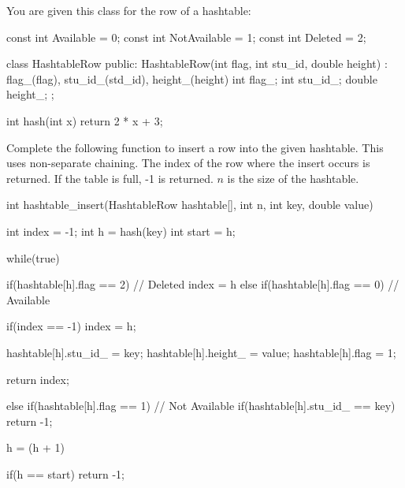 

You are given this class for the row of a hashtable:
\begin{console}[fontsize=\footnotesize]
const int Available = 0;
const int NotAvailable = 1;
const int Deleted = 2;

class HashtableRow
{
public:
    HashtableRow(int flag, int stu_id, double height)
        : flag_(flag), stu_id_(std_id), height_(height)
    {}
    int flag_;
    int stu_id_;
    double height_;
};

int hash(int x)
{
    return 2 * x + 3;
}
\end{console}
Complete the following function to insert a row into the given hashtable.
This uses non-separate chaining.
The index of the row where the insert occurs is returned.
If the table is full, -1 is returned.
$n$ is the size of the hashtable.
\\
\ANSWER
\begin{answercode}
int hashtable_insert(HashtableRow hashtable[], int n, int key, double value)
{
  int index = -1;
  int h = hash(key) %
  int start = h;

  while(true)
  {
    if(hashtable[h].flag == 2) // Deleted
      index = h
    else if(hashtable[h].flag == 0) // Available
    {
      if(index == -1)
        index = h;
        
      hashtable[h].stu_id_ = key;
      hashtable[h].height_ = value;
      hashtable[h].flag = 1;
      
      return index;
    }
    else if(hashtable[h].flag == 1) // Not Available
    {
      if(hashtable[h].stu_id_ == key)
        return -1;
    }

    h = (h + 1) %

    if(h == start)
      return -1;
  }
}
\end{answercode}


